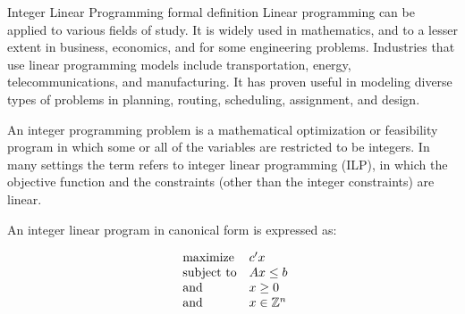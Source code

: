 \documentclass[9pt]{extarticle}
\begin{document}
\begin{section}{Integer Linear Programming formal definition}
        Linear programming can be applied to various fields of study. 
        It is widely used in mathematics, and to a lesser extent in business, economics, and for some engineering problems. 
        Industries that use linear programming models include transportation, energy, telecommunications, and manufacturing. 
        It has proven useful in modeling diverse types of problems in planning, routing, scheduling, assignment, and design.
        \cite{wiki:lp}

        An integer programming problem is a mathematical optimization or feasibility program in which some or all of the 
        variables are restricted to be integers. In many settings the term refers to integer linear programming (ILP), 
        in which the objective function and the constraints (other than the integer constraints) are linear.

        An integer linear program in canonical form is expressed as:

        \begin{equation*}
            \begin{array}{ll@{}ll}
                \text{maximize}  & c'x \\
                \text{subject to}& Ax \leq b \\
                \text{and} & x \ge 0 \\
                \text{and} & x \in \mathbb{Z}^n \\
            \end{array}
        \end{equation*}

    \end{section}
\end{document}
